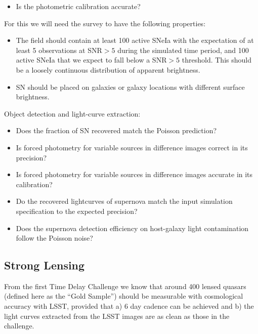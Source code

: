 \begin{itemize}
\item Is the photometric calibration accurate?
\end{itemize}

For this we will need the \TwinklesOne survey to have the following
properties:
\begin{itemize}
\item The field should contain at least 100 active SNeIa with the expectation of at least 5 observations at SNR$>5$ during the simulated time period, and 100 active SNeIa that we expect to fall below a SNR$>5$ threshold.  This should be a loosely continuous distribution of apparent brightness.
\item SN should be placed on galaxies or galaxy locations with different surface brightness.
\end{itemize}

Object detection and light-curve extraction:
\begin{itemize}
\item Does the fraction of SN recovered match the Poisson prediction?
\item Is forced photometry for variable sources in difference images correct in its precision?
\item Is forced photometry for variable sources in difference images accurate in its calibration?
\item Do the recovered lightcurves of supernova match the input simulation specification to the expected precision?
\item Does the supernova detection efficiency on host-galaxy light contamination follow the Poisson noise?
\end{itemize}






\subsection{Strong Lensing}
\label{sec:twinkles1:science:stronglensing}

From the first Time Delay Challenge we know that around 400 lensed
quasars (defined here as the ``Gold Sample'') should be measurable
with cosmological accuracy with LSST, provided that a) 6 day cadence
can be achieved and b) the light curves extracted from the LSST images
are as clean as those in the challenge.


